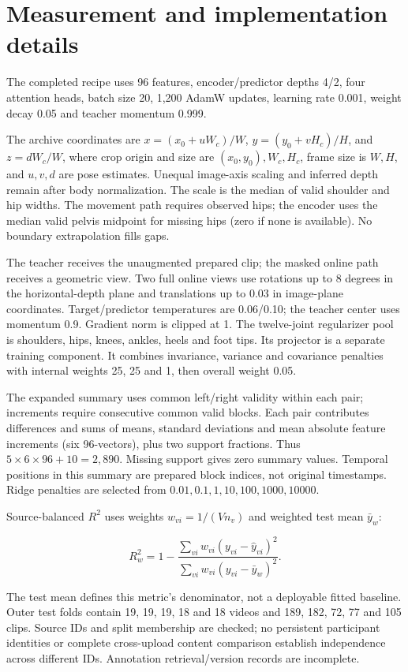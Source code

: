\documentclass{article}
\begin{document}
\section{Measurement and implementation
details}\label{measurement-and-implementation-details}

The completed recipe uses 96 features, encoder/predictor depths 4/2,
four attention heads, batch size 20, 1,200 AdamW updates, learning rate
0.001, weight decay 0.05 and teacher momentum 0.999.

The archive coordinates are \(x=(x_0+uW_c)/W\), \(y=(y_0+vH_c)/H\), and
\(z=dW_c/W\), where crop origin and size are \((x_0,y_0),W_c,H_c\),
frame size is \(W,H\), and \(u,v,d\) are pose estimates. Unequal
image-axis scaling and inferred depth remain after body normalization.
The scale is the median of valid shoulder and hip widths. The movement
path requires observed hips; the encoder uses the median valid pelvis
midpoint for missing hips (zero if none is available). No boundary
extrapolation fills gaps.

The teacher receives the unaugmented prepared clip; the masked online
path receives a geometric view. Two full online views use rotations up
to 8 degrees in the horizontal-depth plane and translations up to 0.03
in image-plane coordinates. Target/predictor temperatures are 0.06/0.10;
the teacher center uses momentum 0.9. Gradient norm is clipped at 1. The
twelve-joint regularizer pool is shoulders, hips, knees, ankles, heels
and foot tips. Its projector is a separate training component. It
combines invariance, variance and covariance penalties with internal
weights 25, 25 and 1, then overall weight 0.05.

The expanded summary uses common left/right validity within each pair;
increments require consecutive common valid blocks. Each pair
contributes differences and sums of means, standard deviations and mean
absolute feature increments (six 96-vectors), plus two support
fractions. Thus \(5\times6\times96+10=2,890\). Missing support gives
zero summary values. Temporal positions in this summary are prepared
block indices, not original timestamps. Ridge penalties are selected
from \(0.01,0.1,1,10,100,1000,10000\).

Source-balanced \(R^2\) uses weights \(w_{vi}=1/(Vn_v)\) and weighted
test mean \(\bar y_w\):

\[R_w^2=1-\frac{\sum_{vi}w_{vi}(y_{vi}-\hat y_{vi})^2}{\sum_{vi}w_{vi}(y_{vi}-\bar y_w)^2}.\]

The test mean defines this metric's denominator, not a deployable fitted
baseline. Outer test folds contain 19, 19, 19, 18 and 18 videos and 189,
182, 72, 77 and 105 clips. Source IDs and split membership are checked;
no persistent participant identities or complete cross-upload content
comparison establish independence across different IDs. Annotation
retrieval/version records are incomplete.
\end{document}
